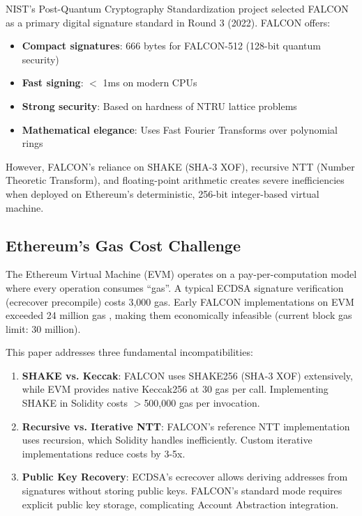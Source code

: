 \documentclass[11pt,a4paper]{article}
\begin{document}
NIST's Post-Quantum Cryptography Standardization project selected FALCON \cite{falcon2020} as a primary digital signature standard in Round 3 (2022). FALCON offers:
\begin{itemize}
    \item \textbf{Compact signatures}: 666 bytes for FALCON-512 (128-bit quantum security)
    \item \textbf{Fast signing}: $<$ 1ms on modern CPUs
    \item \textbf{Strong security}: Based on hardness of NTRU lattice problems
    \item \textbf{Mathematical elegance}: Uses Fast Fourier Transforms over polynomial rings
\end{itemize}

However, FALCON's reliance on SHAKE (SHA-3 XOF), recursive NTT (Number Theoretic Transform), and floating-point arithmetic creates severe inefficiencies when deployed on Ethereum's deterministic, 256-bit integer-based virtual machine.

\subsection{Ethereum's Gas Cost Challenge}

The Ethereum Virtual Machine (EVM) operates on a pay-per-computation model where every operation consumes ``gas''. A typical ECDSA signature verification (ecrecover precompile) costs 3,000 gas. Early FALCON implementations on EVM exceeded 24 million gas \cite{tetration2023falcon}, making them economically infeasible (current block gas limit: 30 million).

This paper addresses three fundamental incompatibilities:
\begin{enumerate}
    \item \textbf{SHAKE vs. Keccak}: FALCON uses SHAKE256 (SHA-3 XOF) extensively, while EVM provides native Keccak256 at 30 gas per call. Implementing SHAKE in Solidity costs $>$500,000 gas per invocation.
    \item \textbf{Recursive vs. Iterative NTT}: FALCON's reference NTT implementation uses recursion, which Solidity handles inefficiently. Custom iterative implementations reduce costs by 3-5x.
    \item \textbf{Public Key Recovery}: ECDSA's ecrecover allows deriving addresses from signatures without storing public keys. FALCON's standard mode requires explicit public key storage, complicating Account Abstraction integration.
\end{enumerate}
\end{document}
